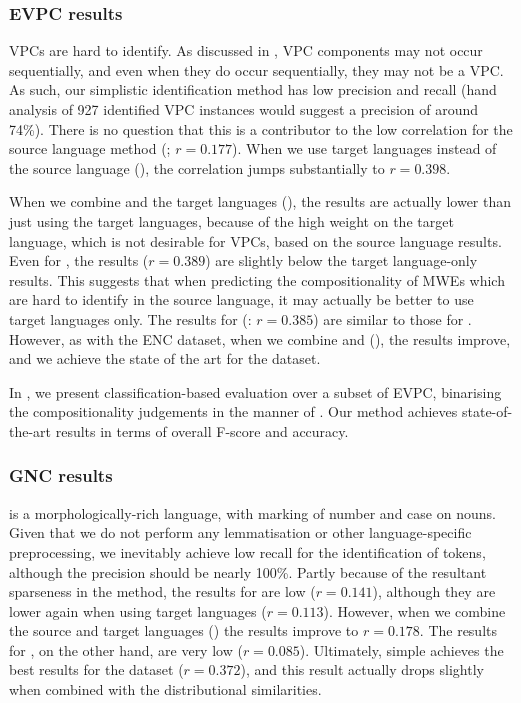 \documentclass[output=paper
,modfonts
,nonflat]{langsci/langscibook}
\begin{document}
\subsubsection{EVPC results}

 VPCs are hard to identify. As discussed in , VPC
components may not occur sequentially, and even when they do occur
sequentially, they may not be a VPC. As such, our simplistic
identification method has low precision and recall (hand analysis of 927
identified VPC instances would suggest a precision of around 74\%). There is no
question that this is a contributor to the low correlation for the
source language method (\CSsource; $r = 0.177$). When we use target
languages instead of the source language (\CStarg), the correlation
jumps substantially to $r = 0.398$.

When we combine  and the target languages (\CSsourcetarg), the
results are actually lower than just using the target languages, because
of the high weight on the target language, which is not desirable for
VPCs, based on the source language results. Even for \CSsvr, the results
($r = 0.389$) are slightly below the target language-only results. This
suggests that when predicting the compositionality of MWEs which are
hard to identify in the source language, it may actually be better to
use target languages only. The results for  (\CSstring:
$r = 0.385$) are similar to those for \CStarg. However, as with the ENC
dataset, when we combine  and 
(\CSall), the results improve, and we achieve the state of the art for
the dataset.

In , we present classification-based evaluation
over a subset of EVPC, binarising the compositionality judgements in the
manner of \citet{bannard2003}. Our method achieves state-of-the-art
results in terms of overall F-score and accuracy.



\subsubsection{GNC results}

 is a morphologically-rich language, with marking of number and
case on nouns. Given that we do not perform any lemmatisation or other
language-specific preprocessing, we inevitably achieve low recall for
the identification of  tokens, although the precision
should be nearly 100\%. Partly because of the resultant sparseness in
the  method, the results for \CSsource are
low ($r = 0.141$), although they are lower again when using target
languages ($r = 0.113$). However, when we combine the source and
target languages (\CSsourcetarg) the results improve to $r =
0.178$. The results for \CSsvr, on the other hand, are very low ($r =
0.085$). Ultimately, simple  achieves the best
results for the dataset ($r = 0.372$), and this result actually drops
slightly when combined with the distributional similarities.
\end{document}
